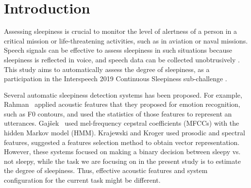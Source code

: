 \section{Introduction}
Assessing sleepiness is crucial to monitor the level of alertness of a person in a critical mission or life-threatening activities, such as in aviation or naval missions. 
Speech signals can be effective to assess sleepiness in such situations because sleepiness is reflected in voice, and speech data can be collected unobtrusively \cite{de2019speech}.
This study aims to automatically assess the degree of sleepiness, as a participation in the Interspeech 2019 Continuous Sleepiness sub-challenge \cite{schullerinterspeech}.


Several automatic sleepiness detection systems has been proposed.
For example, Rahman~\etal \cite{rahman2011detecting} applied acoustic features that they proposed for emotion recognition, such as F0 contours, and used the statistics of those features to represent an utterances.
Gaj\v{s}ek~\etal \cite{Gajsek2011} used mel-frequency cepstral coefficients (MFCCs) with the hidden Markov model (HMM).
Krajewski and Kroger \cite{Krajewski2007} used prosodic and spectral features, suggested a features selection method to obtain vector representation.
However, these systems focused on making a binary decision between sleepy vs. not sleepy, while the task we are focusing on in the present study is to estimate the degree of sleepiness.
Thus, effective acoustic features and system configuration for the current task might be different. 

